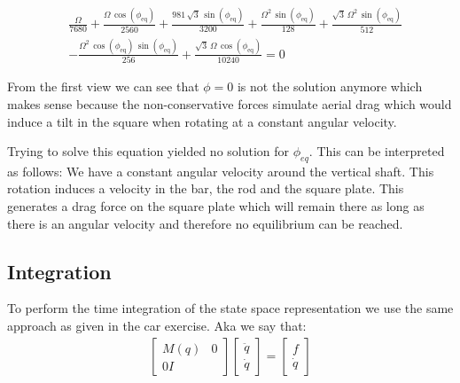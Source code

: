 \begin{equation}
    \begin{split}
        &\frac{\Omega }{7680}+\frac{\Omega \,\cos\left(\phi _{\mathrm{eq}}\right)}{2560}+\frac{981\,\sqrt{3}\,\sin\left(\phi _{\mathrm{eq}}\right)}{3200}+\frac{\Omega ^2\,\sin\left(\phi _{\mathrm{eq}}\right)}{128}+\frac{\sqrt{3}\,\Omega ^2\,\sin\left(\phi _{\mathrm{eq}}\right)}{512}\\
        &-\frac{\Omega ^2\,\cos\left(\phi _{\mathrm{eq}}\right)\,\sin\left(\phi _{\mathrm{eq}}\right)}{256}+\frac{\sqrt{3}\,\Omega \,\cos\left(\phi _{\mathrm{eq}}\right)}{10240} = 0
    \end{split}
\end{equation}

From the first view we can see that $\phi = 0$ is not the solution anymore which makes sense because the non-conservative forces simulate aerial drag which would induce a tilt in the square when rotating at a constant angular velocity.

Trying to solve this equation yielded no solution for $\phi_{eq}$. This can be interpreted as follows: We have a constant angular velocity around the vertical shaft. This rotation induces a velocity in the bar, the rod and the square plate. This generates a drag force on the square plate which will remain there as long as there is an angular velocity and therefore no equilibrium can be reached.



\subsection{Integration}

To perform the time integration of the state space representation we use the same approach as given in the car exercise. Aka we say that:
\begin{equation}
    \begin{split}
        \begin{bmatrix}
            M(q) & 0 \\
            0 I
        \end{bmatrix}\begin{bmatrix}
            \ddot q\\\dot q
        \end{bmatrix} = \begin{bmatrix}
            f\\\dot q
        \end{bmatrix}
    \end{split}
\end{equation}

